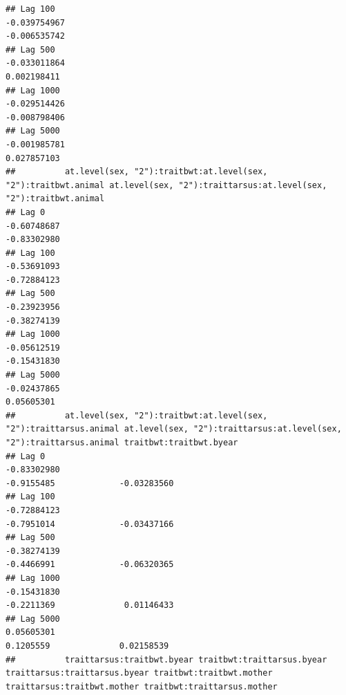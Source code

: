 \documentclass[
  12pt,
]{book}
\begin{document}
\begin{verbatim}
## Lag 100                                                       -0.039754967                                                         -0.006535742
## Lag 500                                                       -0.033011864                                                          0.002198411
## Lag 1000                                                      -0.029514426                                                         -0.008798406
## Lag 5000                                                      -0.001985781                                                          0.027857103
##          at.level(sex, "2"):traitbwt:at.level(sex, "2"):traitbwt.animal at.level(sex, "2"):traittarsus:at.level(sex, "2"):traitbwt.animal
## Lag 0                                                       -0.60748687                                                       -0.83302980
## Lag 100                                                     -0.53691093                                                       -0.72884123
## Lag 500                                                     -0.23923956                                                       -0.38274139
## Lag 1000                                                    -0.05612519                                                       -0.15431830
## Lag 5000                                                    -0.02437865                                                        0.05605301
##          at.level(sex, "2"):traitbwt:at.level(sex, "2"):traittarsus.animal at.level(sex, "2"):traittarsus:at.level(sex, "2"):traittarsus.animal traitbwt:traitbwt.byear
## Lag 0                                                          -0.83302980                                                           -0.9155485             -0.03283560
## Lag 100                                                        -0.72884123                                                           -0.7951014             -0.03437166
## Lag 500                                                        -0.38274139                                                           -0.4466991             -0.06320365
## Lag 1000                                                       -0.15431830                                                           -0.2211369              0.01146433
## Lag 5000                                                        0.05605301                                                            0.1205559              0.02158539
##          traittarsus:traitbwt.byear traitbwt:traittarsus.byear traittarsus:traittarsus.byear traitbwt:traitbwt.mother traittarsus:traitbwt.mother traitbwt:traittarsus.mother

\end{verbatim}
\end{document}
